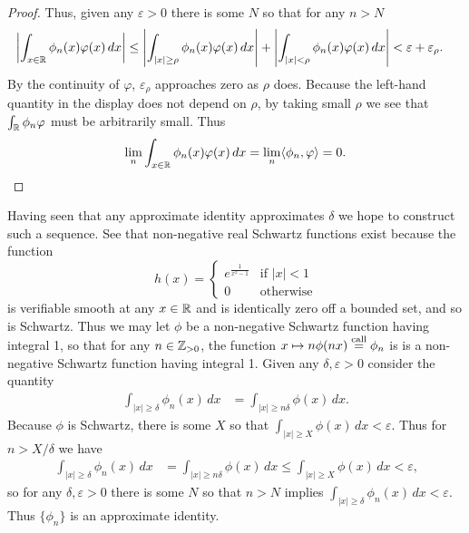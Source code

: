 \begin{proof}
      Thus, given any $\varepsilon>0$ there is some $N$ so that for any $n>N$
      \begin{align*}
        \left| \int_{x\in\mathbb{R}} \phi_n(x)\varphi(x)\,dx \right|
        &\le \left| \int_{|x|\ge\rho} \phi_n(x)\varphi(x)\,dx \right|
        + \left| \int_{|x|<\rho} \phi_n(x)\varphi(x)\,dx\right|
        < \varepsilon + \varepsilon_\rho \text{.}
      \end{align*}
      By the continuity of $\varphi$, $\varepsilon_\rho$ approaches zero as $\rho$ does.
      Because the left-hand quantity in the display does not depend on $\rho$, by taking small $\rho$ we see that $\int_\mathbb{R} \phi_n\varphi$ must be arbitrarily small.
      Thus
      \begin{align*}
        \lim_n \int_{x\in\mathbb{R}} \phi_n(x)\varphi(x)\,dx = \lim_n\langle\phi_n,\varphi\rangle=0 \text{.}
      \end{align*}
    \end{proof}

    Having seen that any approximate identity approximates $\delta$ we hope to construct such a sequence.
    See that non-negative real Schwartz functions exist because the function
    \begin{equation}
      \label{eq:extestfcn}
      h(x) =
      \begin{cases}
        e^\frac{1}{x^2-1} &\text{if }|x|<1\\
        0 &\text{otherwise}
      \end{cases}
    \end{equation}
    is verifiable smooth at any $x\in\mathbb{R}$ and is identically zero off a bounded set, and so is Schwartz.
    Thus we may let $\phi$ be a non-negative Schwartz function having integral 1, so that for any $n\in\mathbb{Z}_{>0}$, the function $x\mapsto n\phi(nx) \overset{\text{call}}{=} \phi_n$ is is a non-negative Schwartz function having integral 1.
    Given any $\delta,\varepsilon>0$ consider the quantity
    \begin{align*}
      \int_{|x|\ge\delta} \phi_n(x) \,dx
      &= \int_{|x|\ge n\delta} \phi(x) \,dx \text{.}
    \end{align*}
    Because $\phi$ is Schwartz, there is some $X$ so that $\int_{|x|\ge X}\phi(x)\,dx<\varepsilon$.
    Thus for $n>X/\delta$ we have 
    \begin{align*}
      \int_{|x|\ge\delta} \phi_n(x) \,dx
      &= \int_{|x|\ge n\delta} \phi(x) \,dx
      \le \int_{|x|\ge X} \phi(x) \,dx
      <\varepsilon \text{,}
    \end{align*}
    so for any $\delta,\varepsilon>0$ there is some $N$ so that $n>N$ implies $\int_{|x|\ge\delta}\phi_n(x)\,dx<\varepsilon$.
    Thus $\{\phi_n\}$ is an approximate identity.


